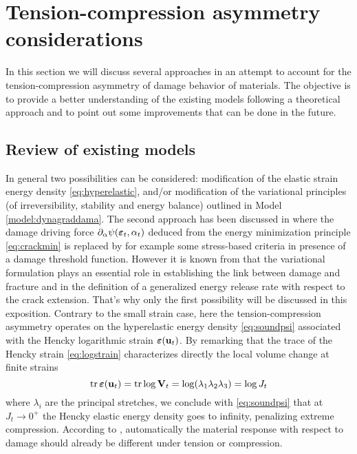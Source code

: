 \section{Tension-compression asymmetry considerations}
In this section we will discuss several approaches in an attempt to account for the tension-compression asymmetry of damage behavior of materials. The objective is to provide a better understanding of the existing models following a theoretical approach and to point out some improvements that can be done in the future.

\subsection{Review of existing models}
In general two possibilities can be considered: modification of the elastic strain energy density \eqref{eq:hyperelastic}, and/or modification of the variational principles (of irreversibility, stability and energy balance) outlined in Model \ref{model:dynagraddama}. The second approach has been discussed in \cite{LorentzKazymyrenko:2014,MieheSchaenzelUlmer:2015} where the damage driving force $\partial_\alpha\psi(\eps_t,\alpha_t)$ deduced from the energy minimization principle \eqref{eq:crackmin} is replaced by for example some stress-based criteria in presence of a damage threshold function. However it is known from \cite{SicsicMarigo:2013} that the variational formulation plays an essential role in establishing the link between damage and fracture and in the definition of a generalized energy release rate with respect to the crack extension. That's why only the first possibility will be discussed in this exposition. Contrary to the small strain case, here the tension-compression asymmetry operates on the hyperelastic energy density \eqref{eq:soundpsi} associated with the Hencky logarithmic strain $\eps(\vec{u}_t)$. By remarking that the trace of the Hencky strain \eqref{eq:logstrain} characterizes directly the local volume change at finite strains
\begin{equation} \label{eq:jacobianhencky}
\tr\eps(\vec{u}_t)=\tr\log\vec{V}_t=\log(\lambda_1\lambda_2\lambda_3)=\log J_t
\end{equation}
where $\lambda_i$ are the principal stretches, we conclude with \eqref{eq:soundpsi} that at $J_t\to 0^+$ the Hencky elastic energy density goes to infinity, penalizing extreme compression. According to \cite{PieroLancioniMarch:2007}, automatically the material response with respect to damage should already be different under tension or compression. 


